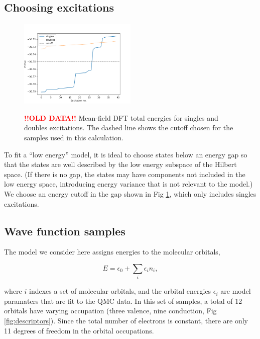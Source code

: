 \subsection{Choosing excitations}

\begin{figure}[h!]
\includegraphics[width=0.5\textwidth]{images/determinant_mf_energies.png}
\label{fig:energy_cutoff}
\caption{\textcolor{red}{\bf !!OLD DATA!!} Mean-field DFT total energies for singles and doubles excitations.
The dashed line shows the cutoff chosen for the samples used in this calculation.}
\end{figure}

To fit a ``low energy'' model, it is ideal to choose states below an energy gap so that the states are well described by the low energy subspace of the Hilbert space.
(If there is no gap, the states may have components not included in the low energy space, introducing energy variance that is not relevant to the model.)
We choose an energy cutoff in the gap shown in Fig \ref{fig:energy_cutoff}, which only includes singles excitations.

\subsection{Wave function samples}

The model we consider here assigns energies to the molecular orbitals,

\begin{equation}
E = \epsilon_0 + \sum_i \epsilon_i n_i,
\end{equation}

where $i$ indexes a set of molecular orbitals, and the orbital energies $\epsilon_i$ are model paramaters that are fit to the QMC data.
In this set of samples, a total of 12 orbitals have varying occupation (three valence, nine conduction, Fig \ref{fig:descriptors}).
Since the total number of electrons is constant, there are only 11 degrees of freedom in the orbital occupations.


